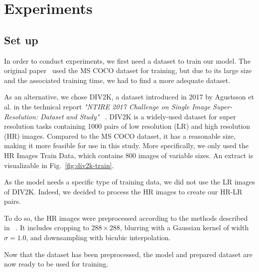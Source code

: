\documentclass{article}
\begin{document}
{
    \section{Experiments}
    \label{sec:experiments}

        \subsection{Set up}

        In order to conduct experiments, we first need a dataset to train our model. The original paper~\cite{https://doi.org/10.48550/arxiv.1603.08155} used the MS COCO dataset \cite{mscoco} for training, but due to its large size and the associated training time, we had to find a more adequate dataset.
        
        As an alternative, we chose DIV2K, a dataset introduced in 2017 by Agustsson et al. in the technical report \textit{"NTIRE 2017 Challenge on Single Image Super-Resolution: Dataset and Study"} ~\cite{div2k-ds}. DIV2K is a widely-used dataset for super resolution tasks containing 1000 pairs of low resolution (LR) and high resolution (HR) images. Compared to the MS COCO dataset, it has a reasonable size, making it more feasible for use in this study. More specifically, we only used the HR Images Train Data, which contains 800 images of variable sizes. An extract is visualizable in Fig.~\ref{fig:div2k-train}.

        \bigskip

        As the model needs a specific type of training data, we did not use the LR images of DIV2K. Indeed, we decided to process the HR images to create our HR-LR pairs. %

        To do so, the HR images were preprocessed according to the methods described in ~\cite{https://doi.org/10.48550/arxiv.1603.08155}. It includes cropping to $288 \times 288$, blurring with a Gaussian kernel of width $\sigma = 1.0$, and downsampling with bicubic interpolation.
        
        Now that the dataset has been preprocessed, the model and prepared dataset are now ready to be used for training.

}
\end{document}
